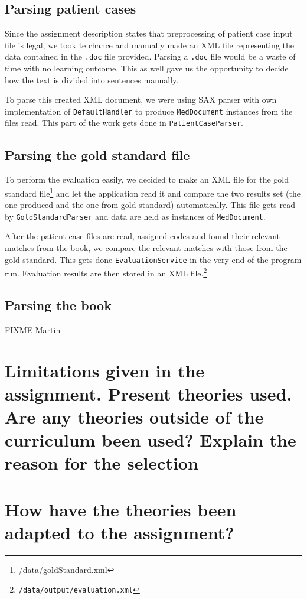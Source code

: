 \documentclass{article}
\begin{document}
\subsection{Parsing patient cases}

Since the assignment description states that preprocessing of patient case input file is legal, we took te chance and manually made an XML file representing the data contained in the \texttt{.doc} file provided. Parsing a \texttt{.doc} file would be a waste of time with no learning outcome. This as well gave us the opportunity to decide how the text is divided into sentences manually.

To parse this created XML document, we were using SAX parser with own implementation of \texttt{DefaultHandler} to produce \texttt{MedDocument} instances from the files read. This part of the work gets done in \texttt{PatientCaseParser}.

\subsection{Parsing the gold standard file}

To perform the evaluation easily, we decided to make an XML file for the gold standard file\footnote{/data/goldStandard.xml} and let the application read it and compare the two results set (the one produced and the one from gold standard) automatically. This file gets read by \texttt{GoldStandardParser} and data are held as instances of \texttt{MedDocument}.

After the patient case files are read, assigned codes and found their relevant matches from the book, we compare the relevant matches with those from the gold standard. This gets done \texttt{EvaluationService} in the very end of the program run. Evaluation results are then stored in an XML file.\footnote{\texttt{/data/output/evaluation.xml}}

\subsection{Parsing the book}

FIXME Martin

\section{Limitations given in the assignment. Present theories used. Are any theories outside of the curriculum been used? Explain the reason for the selection}
\section{How have the theories been adapted to the assignment?}
\end{document}
